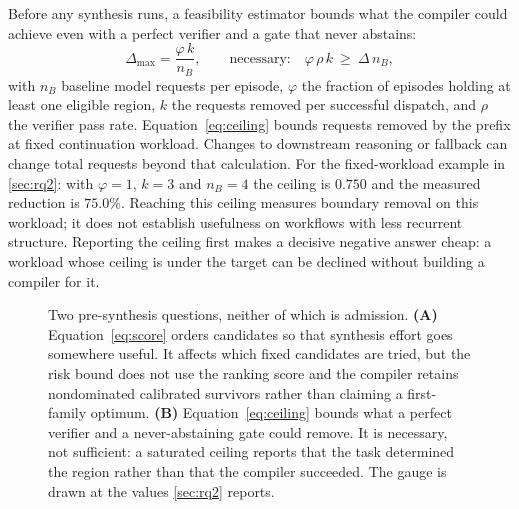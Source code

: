 Before any synthesis runs, a feasibility estimator bounds what the compiler could
achieve even with a perfect verifier and a gate that never abstains:
\begin{equation}
  \Delta_{\max}=\frac{\varphi\,k}{n_B},
  \qquad\text{necessary:}\quad \varphi\,\rho\,k\ \ge\ \Delta\,n_B,
  \label{eq:ceiling}
\end{equation}
with $n_B$ baseline model requests per episode, $\varphi$ the fraction of episodes holding
at least one eligible region, $k$ the requests removed per successful dispatch, and $\rho$
the verifier pass rate.  Equation~\eqref{eq:ceiling} bounds requests removed by the prefix at fixed
continuation workload. Changes to downstream reasoning or fallback can change
total requests beyond that calculation.  For the fixed-workload example in \cref{sec:rq2}: with $\varphi=1$, $k=3$ and $n_B=4$ the
ceiling is $0.750$ and the measured reduction is $75.0\%$.  Reaching this ceiling measures boundary removal on this workload; it does not
establish usefulness on workflows with less recurrent structure.  Reporting the ceiling first makes a decisive negative
answer cheap: a workload whose ceiling is under the target can be declined without
building a compiler for it.

\begin{figure}[t]
  \centering
  
  \caption{Two pre-synthesis questions, neither of which is admission.  \textbf{(A)}
  Equation~\eqref{eq:score} orders candidates so that synthesis effort goes somewhere useful.
  It affects which fixed candidates are tried, but the risk bound does not use the ranking score and the
  compiler retains nondominated calibrated survivors rather than claiming a first-family
  optimum.  \textbf{(B)} Equation~\eqref{eq:ceiling} bounds what a perfect verifier and a
  never-abstaining gate could remove.  It is necessary, not sufficient: a saturated
  ceiling reports that the task determined the region rather than that the compiler
  succeeded.  The gauge is drawn at the values \cref{sec:rq2} reports.}
  \label{fig:rank-ceiling}
\end{figure}

